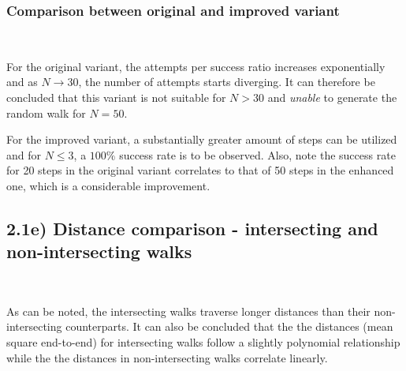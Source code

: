 \documentclass[12pt]{article}
\begin{document}
\subsubsection*{Comparison between original and improved variant}
\begin{figure*}[ht!]
\begin{center}
   \\
   \caption{\label{workflow} (a) Success rate (b) Attempts per success}
\end{center}
\end{figure*}
\noindent For the original variant, the attempts per success ratio increases exponentially and as
\newline $N \to 30$, the number of attempts starts diverging. It can therefore be concluded that this variant is not suitable for $N > 30$ and \textit{unable} to generate the random walk for $N = 50$.

\newpage
\noindent For the improved variant, a substantially greater amount of steps can be utilized and for $N \leq 3$, a $100 \%$ success rate is to be observed. 
Also, note the success rate for 20 steps in the original variant correlates to that of 50 steps in the enhanced one, which is a considerable improvement.

\subsection*{2.1e) Distance comparison - intersecting and non-intersecting walks}

\begin{figure*}[ht!]
\begin{center}
   \\
   \caption{\label{workflow} (a) Distance comparison  (b) Log-log distance  comparison}
\end{center}
\end{figure*}



\noindent As can be noted, the intersecting walks traverse longer distances than their non-intersecting counterparts. It can also be concluded that the the distances (mean square end-to-end) for intersecting walks follow a slightly polynomial relationship while the the distances in non-intersecting walks correlate linearly. 
\end{document}
